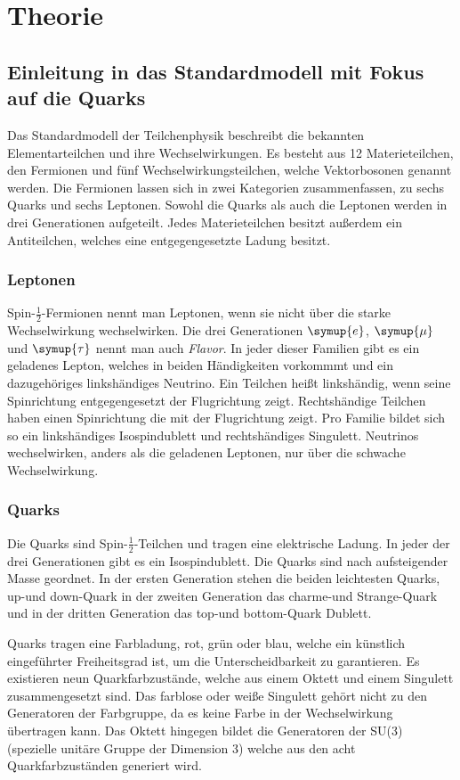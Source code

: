 \chapter{Theorie}
\label{sec:theorie}
\section{Einleitung in das Standardmodell mit Fokus auf die Quarks}

Das Standardmodell der Teilchenphysik beschreibt die bekannten
Elementarteilchen und ihre Wechselwirkungen.
Es besteht aus 12 Materieteilchen, den Fermionen und f\"unf
Wechselwirkungsteilchen, welche Vektorbosonen genannt werden.
Die Fermionen lassen sich in zwei Kategorien zusammenfassen,
zu sechs Quarks und sechs Leptonen.
Sowohl die Quarks als auch die Leptonen werden in drei Generationen
aufgeteilt.
Jedes Materieteilchen besitzt au\ss erdem ein Antiteilchen, welches eine
entgegengesetzte Ladung besitzt.

\subsection{Leptonen}
Spin-$\frac{1}{2}$-Fermionen nennt man Leptonen, wenn sie nicht \"uber die
starke Wechselwirkung wechselwirken.
Die drei Generationen $\symup{e}$, $\symup{\mu}$ und $\symup{\tau}$
nennt man auch \textit{Flavor}.
In jeder dieser Familien gibt es ein geladenes Lepton, welches in beiden
H\"andigkeiten vorkommmt und ein dazugeh\"origes linksh\"andiges Neutrino.
Ein Teilchen hei\ss t linksh\"andig, wenn seine Spinrichtung entgegengesetzt
der Flugrichtung zeigt.
Rechtsh\"andige Teilchen haben einen Spinrichtung die mit der
Flugrichtung zeigt.
Pro Familie bildet sich so ein linksh\"andiges Isospindublett und
rechtsh\"andiges Singulett.
Neutrinos wechselwirken, anders als die geladenen Leptonen,
nur \"uber die schwache Wechselwirkung.

\subsection{Quarks}
Die Quarks sind Spin-$\frac{1}{2}$-Teilchen und
tragen eine elektrische Ladung.
In jeder der drei Generationen gibt es ein Isospindublett.
Die Quarks sind nach aufsteigender Masse geordnet.
In der ersten Generation stehen die beiden leichtesten Quarks,
up-und down-Quark in der zweiten Generation das charme-und Strange-Quark
und in der dritten Generation das top-und bottom-Quark Dublett.

Quarks tragen eine Farbladung, rot, gr\"un oder blau, welche ein
k\"unstlich eingef\"uhrter Freiheitsgrad ist, um die
Unterscheidbarkeit zu garantieren.
Es existieren neun Quarkfarbzust\"ande, welche aus einem Oktett und
einem Singulett zusammengesetzt sind.
Das farblose oder wei\ss e Singulett geh\"ort nicht zu den
Generatoren der Farbgruppe,
da es keine Farbe in der Wechselwirkung \"ubertragen kann.
Das Oktett hingegen bildet die Generatoren der SU(3)
(spezielle unit\"are Gruppe der Dimension 3) welche aus den
acht Quarkfarbzust\"anden generiert wird.

